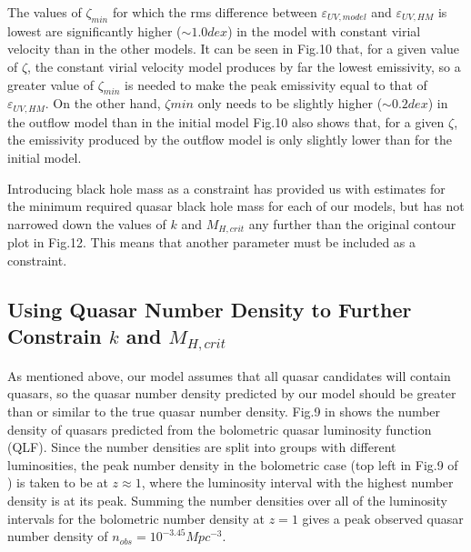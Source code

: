 \documentclass[12pt, twocolumn]{report}%
\begin{document}
The values of $\zeta_{min}$ for which the rms difference between $\varepsilon_{UV,model}$ and $\varepsilon_{UV,HM}$ is lowest are significantly higher ($\sim1.0dex$) in the model with constant virial velocity than in the other models. It can be seen in Fig.10 that, for a given value of $\zeta$, the constant virial velocity model produces by far the lowest emissivity, so a greater value of $\zeta_{min}$ is needed to make the peak emissivity equal to that of $\varepsilon_{UV,HM}$. On the other hand, $\zeta{min}$ only needs to be slightly higher ($\sim0.2dex$) in the outflow model than in the initial model Fig.10 also shows that, for a given $\zeta$, the emissivity produced by the outflow model is only slightly lower than for the initial model.\par

Introducing black hole mass as a constraint has provided us with estimates for the minimum required quasar black hole mass for each of our models, but has not narrowed down the values of $k$ and $M_{H,crit}$ any further than the original contour plot in Fig.12. This means that another parameter must be included as a constraint.

\subsection{Using Quasar Number Density to Further Constrain $k$ and $M_{H,crit}$}

As mentioned above, our model assumes that all quasar candidates will contain quasars, so the quasar number density predicted by our model should be greater than or similar to the true quasar number density. Fig.9 in \cite{Hopkins} shows the number density of quasars predicted from the bolometric quasar luminosity function (QLF). Since the number densities are split into groups with different luminosities, the peak number density in the bolometric case (top left in Fig.9 of \citeauthor{Hopkins}) is taken to be at $z\approx1$, where the luminosity interval with the highest number density is at its peak. Summing the number densities over all of the luminosity intervals for the bolometric number density at $z=1$ gives a peak observed quasar number density of $n_{obs}=10^{-3.45}Mpc^{-3}$.\par
\end{document}
